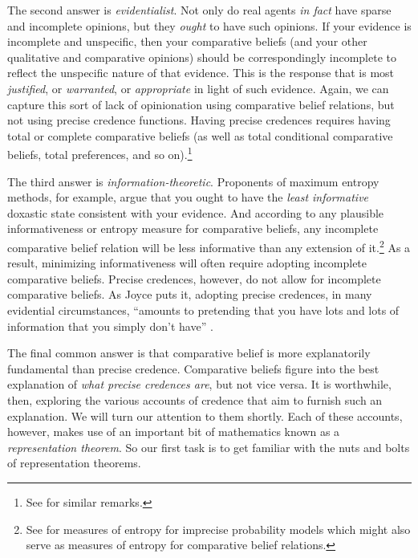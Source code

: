 The second answer is \textit{evidentialist}. Not only do real agents \textit{in fact} have sparse and incomplete opinions, but they \textit{ought} to have such opinions. If your evidence is incomplete and unspecific, then your comparative beliefs (and your other qualitative and comparative opinions) should be correspondingly incomplete to reflect the unspecific nature of that evidence. This is the response that is most \textit{justified}, or \textit{warranted}, or \textit{appropriate} in light of such evidence. Again, we can capture this sort of lack of opinionation using comparative belief relations, but not using precise credence functions. Having precise credences requires having total or complete comparative beliefs (as well as total conditional comparative beliefs, total preferences, and so on).\footnote{See \citet[p. 171]{Joyce2005} for similar remarks.}



The third answer is \textit{information-theoretic}. Proponents of maximum entropy methods, for example, argue that you ought to have the \textit{least informative} doxastic state consistent with your evidence. And according to any plausible informativeness or entropy measure for comparative beliefs, any incomplete comparative belief relation will be less informative than any extension of it.\footnote{See \citet{Abellan2000,Abellan2003} for measures of entropy for imprecise probability models which might also serve as measures of entropy for comparative belief relations.} As a result, minimizing informativeness will often require adopting incomplete comparative beliefs. Precise credences, however, do not allow for incomplete comparative beliefs. As Joyce puts it, adopting precise credences, in many evidential circumstances, ``amounts to pretending that you have lots and lots of information that you simply don't have'' \citep[p. 284]{Joyce2010}.

The final common answer is that comparative belief is more explanatorily fundamental than precise credence. Comparative beliefs figure into the best explanation of \textit{what precise credences are}, but not vice versa. It is worthwhile, then, exploring the various accounts of credence that aim to furnish such an explanation. We will turn our attention to them shortly. Each of these accounts, however, makes use of an important bit of mathematics known as a \textit{representation theorem}. So our first task is to get familiar with the nuts and bolts of representation theorems.






